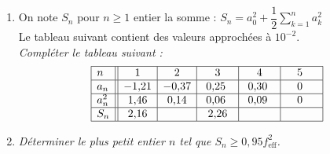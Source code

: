 \documentclass[a4paper,11pt]{article}
\begin{document}
\begin{enumerate}
	\item On note $S_n$ pour $n\geq 1$ entier la somme : $S_n=a_0^2+\dfrac{1}{2}\displaystyle\sum_{k=1}^n a_k^2$\\
	Le tableau suivant contient des valeurs approchées à $10^{-2}$.\\
	\emph{Compléter le tableau suivant :}
$$\begin{array}{|l||c|c|c|c|c|}\hline
n	&1	&2	&3	&4	&~~5~~~  \\ \hline
a_n	&-1,\!21&-0,\!37&~0,\!25~~&~0,\!30~~&~~~0~~~~  \\ \hline
a_n^2	&1,\!46	&0,\!14	&~0,\!06~~&~0,\!09~~&~~~0~~~~  \\ \hline
S_n	&2,\!16	&	&2,\!26&	& \\ \hline
\end{array}$$
\item \emph{Déterminer le plus petit entier $n$ tel que $S_n\geq0,\!95f_{\textrm{eff}}^2$.}
\end{enumerate}
\end{document}
